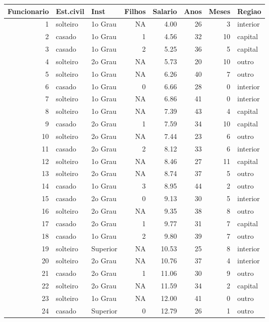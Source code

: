 \documentclass[10pt,a4paper]{book}
\begin{document}
\begin{tabular}{r|l|l|r|r|r|r|l}
\hline
Funcionario & Est.civil & Inst & Filhos & Salario & Anos & Meses & Regiao\\
\hline
1 & solteiro & 1o Grau & NA & 4.00 & 26 & 3 & interior\\
\hline
2 & casado & 1o Grau & 1 & 4.56 & 32 & 10 & capital\\
\hline
3 & casado & 1o Grau & 2 & 5.25 & 36 & 5 & capital\\
\hline
4 & solteiro & 2o Grau & NA & 5.73 & 20 & 10 & outro\\
\hline
5 & solteiro & 1o Grau & NA & 6.26 & 40 & 7 & outro\\
\hline
6 & casado & 1o Grau & 0 & 6.66 & 28 & 0 & interior\\
\hline
7 & solteiro & 1o Grau & NA & 6.86 & 41 & 0 & interior\\
\hline
8 & solteiro & 1o Grau & NA & 7.39 & 43 & 4 & capital\\
\hline
9 & casado & 2o Grau & 1 & 7.59 & 34 & 10 & capital\\
\hline
10 & solteiro & 2o Grau & NA & 7.44 & 23 & 6 & outro\\
\hline
11 & casado & 2o Grau & 2 & 8.12 & 33 & 6 & interior\\
\hline
12 & solteiro & 1o Grau & NA & 8.46 & 27 & 11 & capital\\
\hline
13 & solteiro & 2o Grau & NA & 8.74 & 37 & 5 & outro\\
\hline
14 & casado & 1o Grau & 3 & 8.95 & 44 & 2 & outro\\
\hline
15 & casado & 2o Grau & 0 & 9.13 & 30 & 5 & interior\\
\hline
16 & solteiro & 2o Grau & NA & 9.35 & 38 & 8 & outro\\
\hline
17 & casado & 2o Grau & 1 & 9.77 & 31 & 7 & capital\\
\hline
18 & casado & 1o Grau & 2 & 9.80 & 39 & 7 & outro\\
\hline
19 & solteiro & Superior & NA & 10.53 & 25 & 8 & interior\\
\hline
20 & solteiro & 2o Grau & NA & 10.76 & 37 & 4 & interior\\
\hline
21 & casado & 2o Grau & 1 & 11.06 & 30 & 9 & outro\\
\hline
22 & solteiro & 2o Grau & NA & 11.59 & 34 & 2 & capital\\
\hline
23 & solteiro & 1o Grau & NA & 12.00 & 41 & 0 & outro\\
\hline
24 & casado & Superior & 0 & 12.79 & 26 & 1 & outro\\

\end{tabular}
\end{document}
